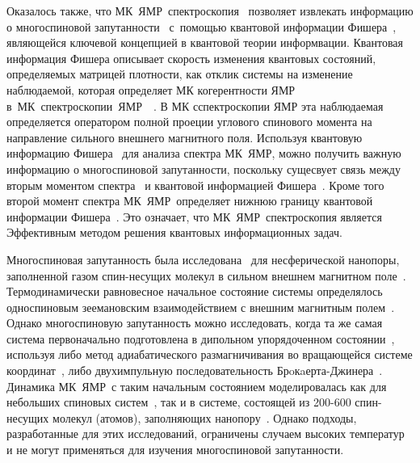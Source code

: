 \documentclass[utf8]{jetp}
\begin{document}
Оказалось также, что МК~ЯМР~спектроскопия~\cite{Baum_1985} позволяет извлекать информацию о многоспиновой запутанности~\cite{G_rttner_2018} с~помощью квантовой информации Фишера~\cite{T_th_2014, Pezz__2018}, являющейся ключевой концепцией в квантовой теории информвации.
Квантовая информация Фишера описывает скорость изменения квантовых состояний,
определяемых матрицей плотности, как отклик системы на изменение наблюдаемой,  которая определяет МК когерентности ЯМР в~МК~спектроскопии~ЯМР~~\cite{Baum_1985}. В МК сспектроскопии ЯМР эта наблюдаемая определяется оператором полной проеции углового спинового момента на направление сильного внешнего магнитного поля.
Используя квантовую информацию Фишера~\cite{Liu_2014} для анализа спектра МК~ЯМР,
можно получить важную информацию о многоспиновой запутанности,
поскольку сущесвует связь между вторым моментом спектра~\cite{Khitrin_1997} и квантовой информацией Фишера~\cite{G_rttner_2018,Doronin_2019}.
Кроме того второй момент спектра МК~ЯМР~определяет нижнюю границу квантовой информации Фишера~\cite{G_rttner_2018}.
Это означает, что МК~ЯМР~спектроскопия является Эффективным методом решения квантовых информационных задач.

Многоспиновая запутанность была исследована~\cite{Doronin_2019} для несферической нанопоры,
заполненной газом  спин-несущих молекул в сильном внешнем магнитном поле~\cite{Baugh_2001,Doronin_2009}.
Термодинамически равновесное начальное состояние системы определялось односпиновым зеемановским взаимодействием с внешним магнитным полем~\cite{Doronin_2007a}.
Однако  многоспиновую запутанность можно  исследовать,
когда та же самая система первоначально подготовлена в дипольном упорядоченном состоянии~\cite{Goldman_1970},
используя либо метод адиабатического размагничивания во вращающейся системе координат~\cite{Goldman_1970, Slichter_1961},
либо двухимпульную последовательность Брoкaерта-Джинера~\cite{Goldman_1970, Jeener_1967}.
Динамика МК~ЯМР~с таким начальным состоянием моделировалась как для небольших спиновых систем~\cite{Doronin_2007a, Doronin_2007b},
так и в системе, состоящей из 200-600 спин-несущих молекул (атомов), заполняющих нанопору~\cite{Doronin_2011}.
Однако подходы, разработанные для этих исследований, ограничены случаем высоких температур и не могут применяться  для изучения многоспиновой запутанности.
\end{document}
